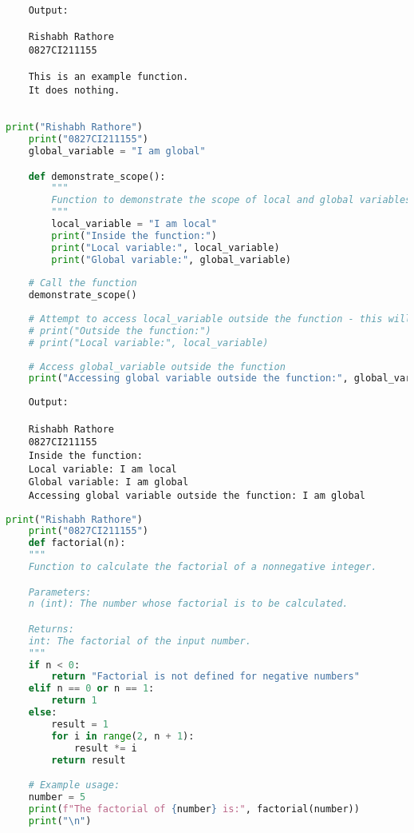 \documentclass{report}
\begin{document}
\begin{verbatim}
	Output:

	Rishabh Rathore
	0827CI211155

    This is an example function.
    It does nothing.


\end{verbatim}


\newpage


\sol 
\begin{lstlisting}[language=Python]
	print("Rishabh Rathore")
	print("0827CI211155")
	global_variable = "I am global"

	def demonstrate_scope():
		"""
		Function to demonstrate the scope of local and global variables.
		"""
		local_variable = "I am local"
		print("Inside the function:")
		print("Local variable:", local_variable)
		print("Global variable:", global_variable)
	
	# Call the function
	demonstrate_scope()
	
	# Attempt to access local_variable outside the function - this will raise an error
	# print("Outside the function:")
	# print("Local variable:", local_variable)
	
	# Access global_variable outside the function
	print("Accessing global variable outside the function:", global_variable)


\end{lstlisting}

\begin{verbatim}
	Output:

	Rishabh Rathore
	0827CI211155
	Inside the function:
	Local variable: I am local
	Global variable: I am global
	Accessing global variable outside the function: I am global

\end{verbatim}


\newpage


\sol 
\begin{lstlisting}[language=Python]
	print("Rishabh Rathore")
	print("0827CI211155")
	def factorial(n):
    """
    Function to calculate the factorial of a nonnegative integer.

    Parameters:
    n (int): The number whose factorial is to be calculated.

    Returns:
    int: The factorial of the input number.
    """
    if n < 0:
        return "Factorial is not defined for negative numbers"
    elif n == 0 or n == 1:
        return 1
    else:
        result = 1
        for i in range(2, n + 1):
            result *= i
        return result

	# Example usage:
	number = 5
	print(f"The factorial of {number} is:", factorial(number))
	print("\n")
  

\end{lstlisting}
\end{document}
